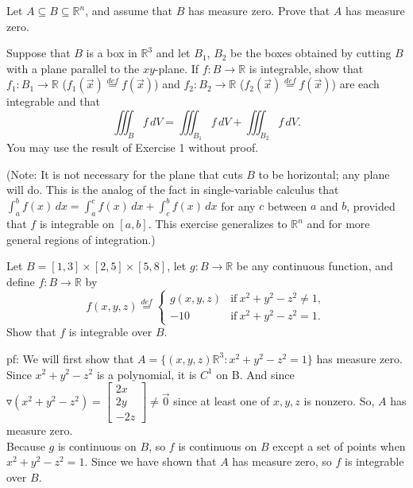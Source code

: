 \documentclass[11pt,letterpaper,cm]{nupset}
\newcommand{\bmat}[1]{\begin{bmatrix} #1 \end{bmatrix}}
\begin{document}
\begin{problem}[Exercise 1] Let $A\subseteq B\subseteq\mathbb{R}^n$, and assume that $B$ has measure zero.  Prove that $A$ has measure zero.
\end{problem}
\begin{solution}
\end{solution}
\newpage

\begin{problem}[Exercise 2] Suppose that $B$ is a box in $\mathbb{R}^3$ and let $B_1$, $B_2$ be the boxes obtained by cutting $B$ with a plane parallel to the $xy$-plane.  If $f:B\to\mathbb{R}$ is integrable, show that $f_1:B_1\to\mathbb{R}$ ($f_1(\vec{x})\stackrel{def}{=}f(\vec{x})$) and $f_2:B_2\to\mathbb{R}$ ($f_2(\vec{x})\stackrel{def}{=}f(\vec{x})$) are each integrable and that $$\iiint_B f\,dV =\iiint_{B_1} f\,dV+\iiint_{B_2} f\,dV.$$
	You may use the result of Exercise 1 without proof.
	\medskip
	
	(Note: It is not necessary for the plane that cuts $B$ to be horizontal; any plane will do.  This is the analog of the fact in single-variable calculus that $\displaystyle\int_a^b f(x)\,dx = \int_a^c f(x)\,dx+\int_c^b f(x)\,dx$ for any $c$ between $a$ and $b$, provided that $f$ is integrable on $[a,b]$.  This exercise generalizes to $\mathbb{R}^n$ and for more general regions of integration.)
\end{problem}
\begin{solution}
\end{solution}
\newpage

\begin{problem}[Exercise 3] Let $B=[1,3]\times[2,5]\times[5,8]$, let $g:B\to\mathbb{R}$ be any continuous function, and define $f:B\to\mathbb{R}$ by $$f(x,y,z)\stackrel{def}{=}\begin{cases} g(x,y,z) & \mbox{if}\ x^2+y^2-z^2\neq 1,\\ -10 & \mbox{if}\ x^2+y^2-z^2=1.\end{cases}$$  Show that $f$ is integrable over $B$.
\end{problem}
\begin{solution}
	pf: We will first show that $A=\{(x,y,z)\mathbb{R}^3:x^2+y^2-z^2=1\}$ has measure zero. Since $x^2+y^2-z^2$ is a polynomial, it is $C^1$ on B. And since $\triangledown(x^2+y^2-z^2)=\bmat{2x\\2y\\-2z}\neq \vec{0}$ since at least one of $x,y,z$ is nonzero. So, $A$ has measure zero.\\
	Because $g$ is continuous on $B$, so $f$ is continuous on $B$ except a set of points when $x^2+y^2-z^2=1$. Since we have shown that $A$ has measure zero, so $f$ is integrable over $B$.
\end{solution}
\newpage
\end{document}
